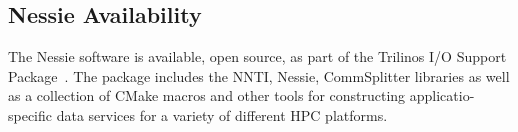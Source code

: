 \subsection{Nessie Availability}

The Nessie software is available, open source, as part
of the Trilinos I/O Support Package~\cite{oldfield:2012:trios-journal}.
The package includes the NNTI, Nessie, CommSplitter libraries as well
as a collection of CMake macros and other tools for constructing 
applicatio-specific data services for a variety of different HPC 
platforms. 


